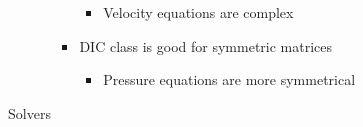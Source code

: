 \documentclass[12pt]{article}
\renewcommand{\_}{\kern-1.5pt\textunderscore\kern-1.5pt}
\begin{document}
\begin{itemize}
\begin{itemize}
\begin{itemize}
\begin{itemize}
	\item Velocity equations are complex\par


\end{itemize}
	\item DIC class is good for symmetric matrices\par

\begin{itemize}
	\item Pressure equations are more symmetrical\par


\end{itemize}
\end{itemize}
\end{itemize}
\end{itemize}

Solvers \par
\end{document}
